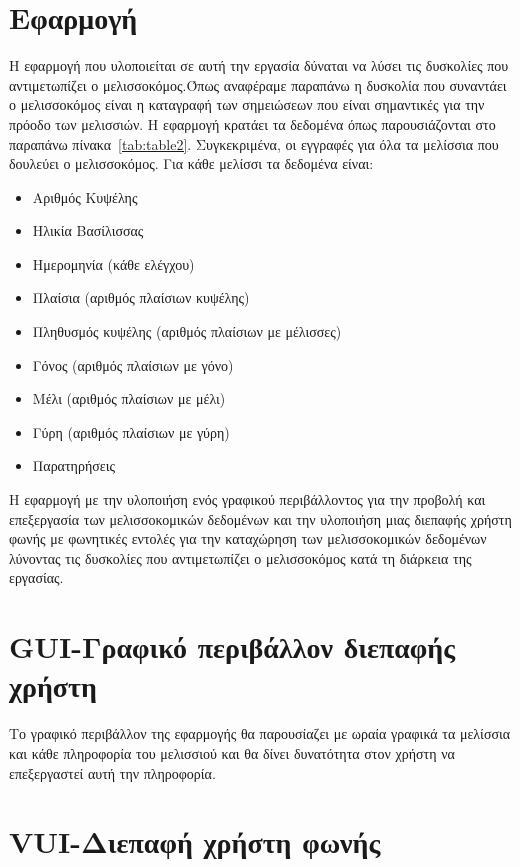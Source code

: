 \documentclass[oneside, 12pt]{book}
\begin{document}
\section{Εφαρμογή}
\label{sec:εφαρμογή}
Η εφαρμογή που υλοποιείται σε αυτή την εργασία δύναται να λύσει τις δυσκολίες που αντιμετωπίζει ο μελισσοκόμος.Όπως αναφέραμε παραπάνω η δυσκολία που συναντάει ο μελισσοκόμος είναι η καταγραφή των σημειώσεων που είναι σημαντικές για την πρόοδο των μελισσιών. Η εφαρμογή κρατάει τα δεδομένα όπως παρουσιάζονται στο παραπάνω πίνακα~\ref{tab:table2}. Συγκεκριμένα, οι εγγραφές για όλα τα μελίσσια που δουλεύει ο μελισσοκόμος.
\newline
Για κάθε μελίσσι τα δεδομένα είναι:
\begin{itemize}
  \item Αριθμός Κυψέλης
  \item Ηλικία Βασίλισσας
  \item Ημερομηνία (κάθε ελέγχου)
  \item Πλαίσια (αριθμός πλαίσιων κυψέλης)
  \item Πληθυσμός κυψέλης (αριθμός πλαίσιων με μέλισσες)
  \item Γόνος (αριθμός πλαίσιων με γόνο)
  \item Μέλι (αριθμός πλαίσιων με μέλι)
  \item Γύρη (αριθμός πλαίσιων με γύρη)
  \item Παρατηρήσεις
\end{itemize}
Η εφαρμογή με την υλοποιήση ενός γραφικού περιβάλλοντος για την προβολή και επεξεργασία των μελισσοκομικών δεδομένων και την υλοποιήση μιας διεπαφής χρήστη φωνής με φωνητικές εντολές για την καταχώρηση των μελισσοκομικών δεδομένων λύνοντας τις δυσκολίες που αντιμετωπίζει ο μελισσοκόμος κατά τη διάρκεια της εργασίας.
\section{GUI-Γραφικό περιβάλλον διεπαφής χρήστη}
\label{sec:gui-γραφικό-περιβάλλον-χρήστη}
Το γραφικό περιβάλλον της εφαρμογής θα παρουσίαζει με ωραία γραφικά τα μελίσσια και κάθε πληροφορία του μελισσιού και θα δίνει δυνατότητα στον χρήστη να επεξεργαστεί αυτή την πληροφορία.
\section{VUI-Διεπαφή χρήστη φωνής}
\label{sec:vui---διεπαφή-χρήστη-φωνής}
\end{document}

